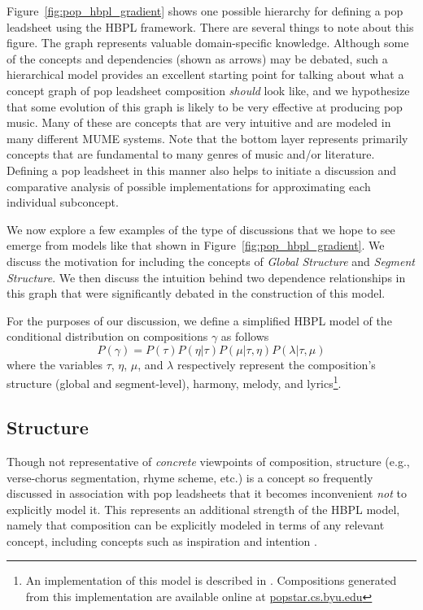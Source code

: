 \documentclass[letterpaper]{article}
\begin{document}
Figure~\ref{fig:pop_hbpl_gradient} shows one possible hierarchy for defining a pop leadsheet using the HBPL framework. There are several things to note about this figure. The graph represents valuable domain-specific knowledge. Although some of the concepts and dependencies (shown as arrows) may be debated, such a hierarchical model provides an excellent starting point for talking about what a concept graph of pop leadsheet composition \emph{should} look like, and we hypothesize that some evolution of this graph is likely to be very effective at producing pop music. Many of these are concepts that are very intuitive and are modeled in many different MUME systems. Note that the bottom layer represents primarily concepts that are fundamental to many genres of music and/or literature. Defining a pop leadsheet in this manner also helps to initiate a discussion and comparative analysis of possible implementations for approximating each individual subconcept. 

We now explore a few examples of the type of discussions that we hope to see emerge from models like that shown in Figure~\ref{fig:pop_hbpl_gradient}. We discuss the motivation for including the concepts of \emph{Global Structure} and \emph{Segment Structure}. We then discuss the intuition behind two dependence relationships in this graph that were significantly debated in the construction of this model.

For the purposes of our discussion, we define a simplified HBPL model of the conditional distribution on compositions $\gamma$ as follows
\begin{equation}
P(\gamma) = P(\tau)P(\eta|\tau)P(\mu|\tau,\eta)P(\lambda|\tau,\mu) \label{eq}
\end{equation}
\noindent where the variables $\tau$, $\eta$, $\mu$, and $\lambda$ respectively represent the composition's structure (global and segment-level), harmony, melody, and lyrics\footnote{An implementation of this model is described in \cite{bodily2017ICCC}. Compositions generated from this implementation are available online at \url{popstar.cs.byu.edu}}.

\subsection{Structure}

Though not representative of \emph{concrete} viewpoints of composition, structure (e.g., verse-chorus segmentation, rhyme scheme, etc.) is a concept so frequently discussed in association with pop leadsheets that it becomes inconvenient \emph{not} to explicitly model it. This represents an additional strength of the HBPL model, namely that composition can be explicitly modeled in terms of any relevant concept, including concepts such as inspiration and intention \cite{bodily2017ICCC}. 
\end{document}
